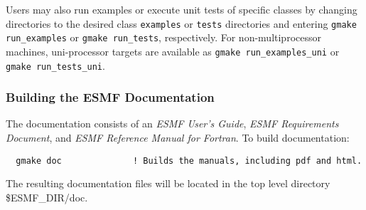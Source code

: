 Users may also run examples or execute unit tests of specific classes
by changing directories to the desired class {\tt examples} or {\tt tests} 
directories and entering {\tt gmake run\_examples} or 
{\tt gmake run\_tests}, respectively.  For non-multiprocessor machines,
uni-processor targets are available as {\tt gmake run\_examples\_uni} or
{\tt gmake run\_tests\_uni}.

\subsubsection{Building the ESMF Documentation}
\label{BuildDocumentation}

The documentation consists of an {\it ESMF User's Guide}, {\it ESMF Requirements 
Document}, and {\it ESMF Reference Manual for Fortran}.  
\noindent To build documentation:
\begin{verbatim}
  gmake doc              ! Builds the manuals, including pdf and html.
\end{verbatim}

\noindent The resulting documentation files will be
located in the top level directory \${ESMF\_DIR}/doc.



